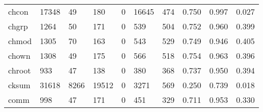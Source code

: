 \begin{longtable}{lp{1.3cm}p{1.3cm}p{1.3cm}p{1.3cm}p{1.3cm}p{1.3cm}p{1.3cm}p{1.3cm}p{1.3cm}}
chcon     &                  17348 &                                 49 &                               180 &                                0 &                             16645 &                             474 &                                   0.750 &                                  0.997 &                                0.027 \\
chgrp     &                   1264 &                                 50 &                               171 &                                0 &                               539 &                             504 &                                   0.752 &                                  0.960 &                                0.399 \\
chmod     &                   1305 &                                 70 &                               163 &                                0 &                               543 &                             529 &                                   0.749 &                                  0.946 &                                0.405 \\
chown     &                   1308 &                                 49 &                               175 &                                0 &                               566 &                             518 &                                   0.754 &                                  0.963 &                                0.396 \\
chroot    &                    933 &                                 47 &                               138 &                                0 &                               380 &                             368 &                                   0.737 &                                  0.950 &                                0.394 \\
cksum     &                  31618 &                               8266 &                             19512 &                                0 &                              3271 &                             569 &                                   0.250 &                                  0.739 &                                0.018 \\
comm      &                    998 &                                 47 &                               171 &                                0 &                               451 &                             329 &                                   0.711 &                                  0.953 &                                0.330 \\

\end{longtable}
